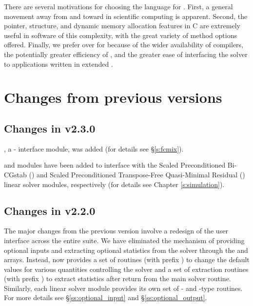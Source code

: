 There are several motivations for choosing the {\C} language for {\ida}.
First, a general movement away from {\F} and toward {\C} in scientific
computing is apparent.  Second, the pointer, structure, and dynamic
memory allocation features in C are extremely useful in software of
this complexity, with the great variety of method options offered.
Finally, we prefer {\C} over {\CPP} for {\ida} because of the wider
availability of {\C} compilers, the potentially greater efficiency of {\C},
and the greater ease of interfacing the solver to applications written
in extended {\F}.

\section{Changes from previous versions}

\subsection*{Changes in v2.3.0}

{\fida}, a {\F}-{\C} interface module, was added (for details see \S\ref{s:fcmix}).

{\idaspbcg} and {\idasptfqmr} modules have been added to interface with the
Scaled Preconditioned Bi-CGstab ({\spbcg}) and Scaled Preconditioned
Transpose-Free Quasi-Minimal Residual ({\sptfqmr}) linear solver modules,
respectively (for details see Chapter \ref{s:simulation}).

\subsection*{Changes in v2.2.0}

The major changes from the previous version involve a redesign of the
user interface across the entire {\sundials} suite. We have eliminated the
mechanism of providing optional inputs and extracting optional statistics 
from the solver through the  and  arrays. Instead,
{\ida} now provides a set of routines (with prefix )
to change the default values for various quantities controlling the
solver and a set of extraction routines (with prefix )
to extract statistics after return from the main solver routine.
Similarly, each linear solver module provides its own set of {-}
and {-type} routines. For more details see \S\ref{ss:optional_input}
and \S\ref{ss:optional_output}.

